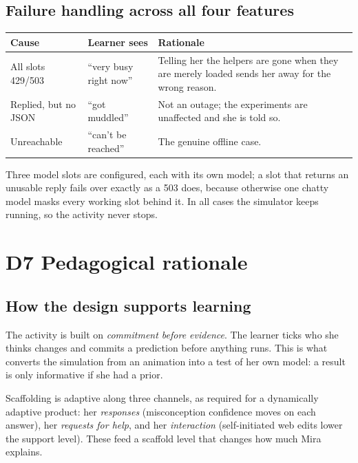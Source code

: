 \documentclass[11pt,a4paper]{article}
\begin{document}
\subsection*{Failure handling across all four features}

\begin{center}
\begin{tabular}{@{}llp{7.4cm}@{}}
\toprule
\textbf{Cause} & \textbf{Learner sees} & \textbf{Rationale}\\
\midrule
All slots 429/503 & ``very busy right now'' & Telling her the helpers are gone when they are
merely loaded sends her away for the wrong reason.\\
Replied, but no JSON & ``got muddled'' & Not an outage; the experiments are unaffected and she
is told so.\\
Unreachable & ``can't be reached'' & The genuine offline case.\\
\bottomrule
\end{tabular}
\end{center}

Three model slots are configured, each with its own model; a slot that returns an unusable reply
fails over exactly as a 503 does, because otherwise one chatty model masks every working slot
behind it. In all cases the simulator keeps running, so the activity never stops.

\section{D7 \quad Pedagogical rationale}

\subsection*{How the design supports learning}

The activity is built on \emph{commitment before evidence}. The learner ticks who she thinks
changes and commits a prediction before anything runs. This is what converts the simulation from
an animation into a test of her own model: a result is only informative if she had a prior.

Scaffolding is adaptive along three channels, as required for a dynamically adaptive product:
her \emph{responses} (misconception confidence moves on each answer), her \emph{requests for
help}, and her \emph{interaction} (self-initiated web edits lower the support level). These feed
a scaffold level that changes how much Mira explains.
\end{document}
